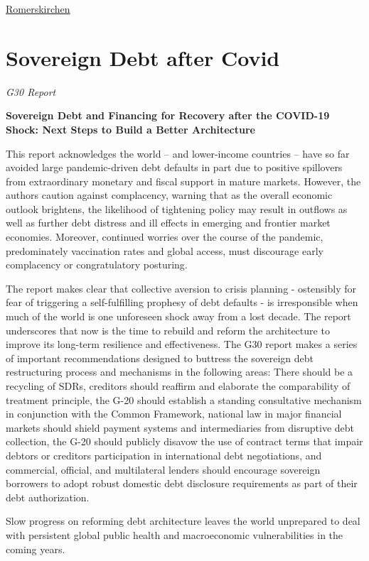 \documentclass[
]{book}
\begin{document}
\href{https://www.public-debt.sps.ed.ac.uk/}{Romerskirchen}

\hypertarget{sovereign-debt-after-covid}{%
\section{Sovereign Debt after Covid}\label{sovereign-debt-after-covid}}

\emph{G30 Report}

\textbf{Sovereign Debt and Financing for Recovery after the COVID-19 Shock: Next Steps to Build a Better Architecture}

This report acknowledges the world -- and lower-income countries -- have so far avoided large pandemic-driven debt defaults in part due to positive spillovers from extraordinary monetary and fiscal support in mature markets. However, the authors caution against complacency, warning that as the overall economic outlook brightens, the likelihood of tightening policy may result in outflows as well as further debt distress and ill effects in emerging and frontier market economies. Moreover, continued worries over the course of the pandemic, predominately vaccination rates and global access, must discourage early complacency or congratulatory posturing.

The report makes clear that collective aversion to crisis planning - ostensibly for fear of triggering a self-fulfilling prophesy of debt defaults - is irresponsible when much of the world is one unforeseen shock away from a lost decade. The report underscores that now is the time to rebuild and reform the architecture to improve its long-term resilience and effectiveness. The G30 report makes a series of important recommendations designed to buttress the sovereign debt restructuring process and mechanisms in the following areas: There should be a recycling of SDRs, creditors should reaffirm and elaborate the comparability of treatment principle, the G-20 should establish a standing consultative mechanism in conjunction with the Common Framework, national law in major financial markets should shield payment systems and intermediaries from disruptive debt collection, the G-20 should publicly disavow the use of contract terms that impair debtors or creditors participation in international debt negotiations, and commercial, official, and multilateral lenders should encourage sovereign borrowers to adopt robust domestic debt disclosure requirements as part of their debt authorization.

Slow progress on reforming debt architecture leaves the world unprepared to deal with persistent global public health and macroeconomic vulnerabilities in the coming years.
\end{document}
